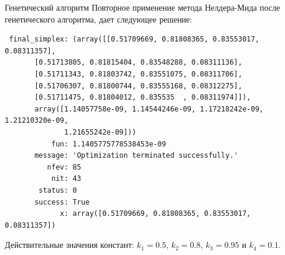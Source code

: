 \documentclass[aspectratio=169, mathserif]{beamer}	%
\begin{document}
\begin{frame}[fragile, label=c]{Генетический алгоритм}
\scriptsize
Повторное применение метода Нелдера-Мида после генетического алгоритма, дает следующее решение:
\vfill
\begin{verbatim}
 final_simplex: (array([[0.51709669, 0.81808365, 0.83553017, 0.08311357],
       [0.51713805, 0.81815404, 0.83548288, 0.08311136],
       [0.51711343, 0.81803742, 0.83551075, 0.08311706],
       [0.51706307, 0.81800744, 0.83555168, 0.08312275],
       [0.51711475, 0.81804012, 0.835535  , 0.08311974]]),
       array([1.14057758e-09, 1.14544246e-09, 1.17218242e-09, 1.21210320e-09,
              1.21655242e-09]))
           fun: 1.1405775778538453e-09
       message: 'Optimization terminated successfully.'
          nfev: 85
           nit: 43
        status: 0
       success: True
             x: array([0.51709669, 0.81808365, 0.83553017, 0.08311357])
\end{verbatim}
\vfill
Действительные значения констант: $k_1=0.5$, $k_2=0.8$, $k_3=0.95$ и $k_4=0.1$.
\vfill
\end{frame}


\end{document}
